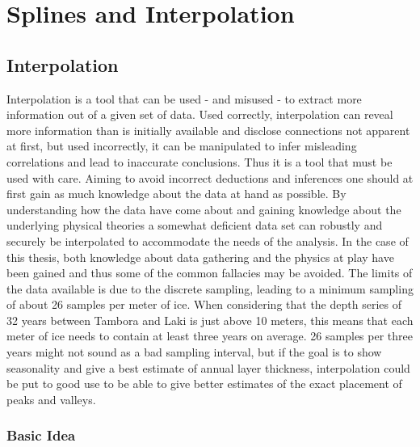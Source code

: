 \documentclass[../../CompleteThesis/Complete_1stDraft.tex]{subfiles}
\begin{document}
	
	\section[Splines and Interpolation]{Splines and Interpolation}	
	\label{Sec:CompMeths_SplinesAndInterpolation}
	\subsection[Interpolation][Interpolation]{Interpolation}
	\label{Subsec:CompMeths_SplinesAndInterpolation_Interpolation}
	Interpolation is a tool that can be used - and misused - to extract more information out of a given set of data. Used correctly, interpolation can reveal more information than is initially available and disclose connections not apparent at first, but used incorrectly, it can be manipulated to infer misleading correlations and lead to inaccurate conclusions. Thus it is a tool that must be used with care. Aiming to avoid incorrect deductions and inferences one should at first gain as much knowledge about the data at hand as possible. By understanding how the data have come about and gaining knowledge about the underlying physical theories a somewhat deficient data set can robustly and securely be interpolated to accommodate the needs of the analysis. In the case of this thesis, both knowledge about data gathering and the physics at play have been gained and thus some of the common fallacies may be avoided. The limits of the data available is due to the discrete sampling, leading to a minimum sampling of about 26 samples per meter of ice.
	When considering that the depth series of 32 years between Tambora and Laki is just above 10 meters, this means that each meter of ice needs to contain at least three years on average. 26 samples per three years might not sound as a bad sampling interval, but if the goal is to show seasonality and give a best estimate of annual layer thickness, interpolation could be put to good use to be able to give better estimates of the exact placement of peaks and valleys.\\	\subsubsection[Basic Idea][Basic Idea]{Basic Idea}
	\label{Subsubsec:CompMeths_SplinesAndInterpolation_Interpolation_BasicIdea}
	
\end{document}
